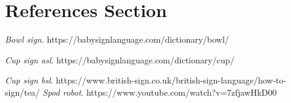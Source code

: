 \documentclass[lettersize,journal]{IEEEtran}
\begin{document}
\section{References Section}

\begin{thebibliography}{1}


{\it{Bowl sign}}. https://babysignlanguage.com/dictionary/bowl/

{\it{ Cup sign asl}}. https://babysignlanguage.com/dictionary/cup/

{\it{Cup sign bsl}}. https://www.british-sign.co.uk/british-sign-language/how-to-sign/tea/
{\it{Spod robot}}. https://www.youtube.com/watch?v=7zfjawHkD00

\end{thebibliography}


\newpage
\end{document}
